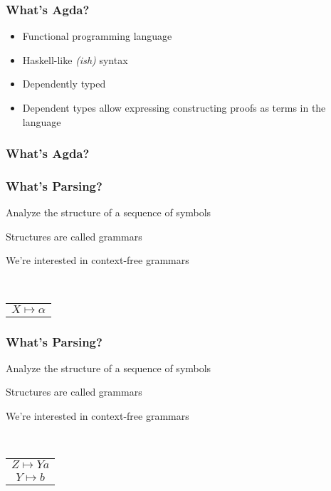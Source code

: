 
\begin{frame}
	\frametitle{What's Agda?}

	\begin{itemize}
		\item Functional programming language
		\item Haskell-like \emph{(ish)} syntax
		\item Dependently typed
		\item Dependent types allow expressing constructing proofs as terms 
			in the language
	\end{itemize}
\end{frame}

\begin{frame}
	\frametitle{What's Agda?}
\end{frame}

\begin{frame}
	\frametitle{What's Parsing?}

	\begin{itemize*}
		\item Analyze the structure of a sequence of symbols
		\item Structures are called grammars
		\item We're interested in context-free grammars
	\end{itemize*}\\
	\vspace{0.5cm}
	\centering
	\begin{tabular}{c}
		$X \mapsto \alpha$ 
	\end{tabular}
	\vspace{2cm}

\end{frame}

\begin{frame}
	\frametitle{What's Parsing?}

	\begin{itemize*}
		\item Analyze the structure of a sequence of symbols
		\item Structures are called grammars
		\item We're interested in context-free grammars
	\end{itemize*}\\
	\vspace{0.5cm}
	\centering
	\begin{tabular}{c}
		$Z \mapsto Ya$  \\
		$Y \mapsto b$ 
	\end{tabular}
	\vspace{2cm}
\end{frame}

